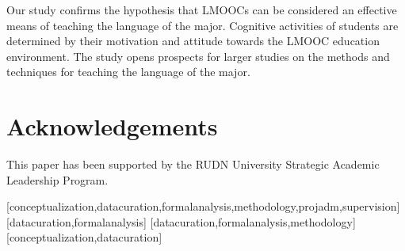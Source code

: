 \documentclass[english]{textolivre}
\begin{document}
Our study confirms the hypothesis that LMOOCs can be considered an effective means of teaching the language of the major. Cognitive activities of students are determined by their motivation and attitude towards the LMOOC education environment. The study opens prospects for larger studies on the methods and techniques for teaching the language of the major.

\section{Acknowledgements}
This paper has been supported by the RUDN University Strategic Academic Leadership Program.


\printbibliography\label{sec-bib}


\begin{contributors}
[conceptualization,datacuration,formalanalysis,methodology,projadm,supervision]
[datacuration,formalanalysis]
[datacuration,formalanalysis,methodology]
[conceptualization,datacuration]
\end{contributors}
\end{document}

